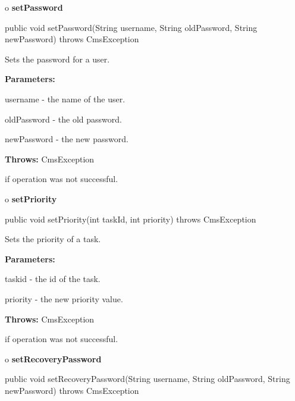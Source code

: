 o {\bf setPassword}

\begin{PRE}
 public void setPassword(String username,
                         String oldPassword,
                         String newPassword) throws CmsException
\end{PRE}

\begin{description}
\htmlDD Sets the password for a user.

\begin{description}
\item {\bf Parameters:}

username - the name of the user.

oldPassword - the old password.

newPassword - the new password.
\item {\bf Throws:} CmsException

if operation was not successful.
\end{description}

\end{description}

o {\bf setPriority}

\begin{PRE}
 public void setPriority(int taskId,
                         int priority) throws CmsException
\end{PRE}

\begin{description}
\htmlDD Sets the priority of a task.

\begin{description}
\item {\bf Parameters:}

taskid - the id of the task.

priority - the new priority value.
\item {\bf Throws:} CmsException

if operation was not successful.
\end{description}

\end{description}

o {\bf setRecoveryPassword}

\begin{PRE}
 public void setRecoveryPassword(String username,
                                 String oldPassword,
                                 String newPassword) throws CmsException
\end{PRE}

